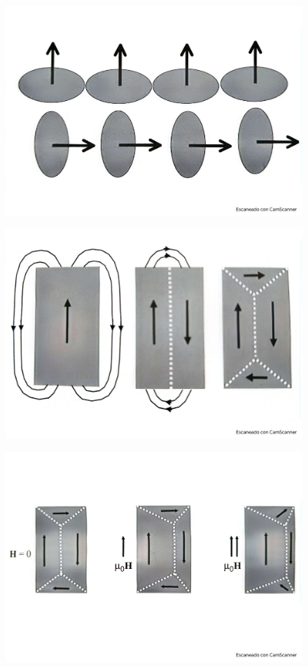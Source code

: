 \begin{figure}[h!] \centering
	\includegraphics[scale=0.5]{Cuerpo/Ch_10/Fotos libro 6.pdf}
	\caption{}
	\label{Fig:10-06}
\end{figure}
\begin{figure}[h!] \centering
	\includegraphics[scale=0.5]{Cuerpo/Ch_10/Fotos libro 7.pdf}
	\caption{}
	\label{Fig:10-07}
\end{figure}
\begin{figure}[h!] \centering
	\includegraphics[scale=0.5]{Cuerpo/Ch_10/Fotos libro 8.pdf}
	\caption{}
	\label{Fig:10-08}
\end{figure}
